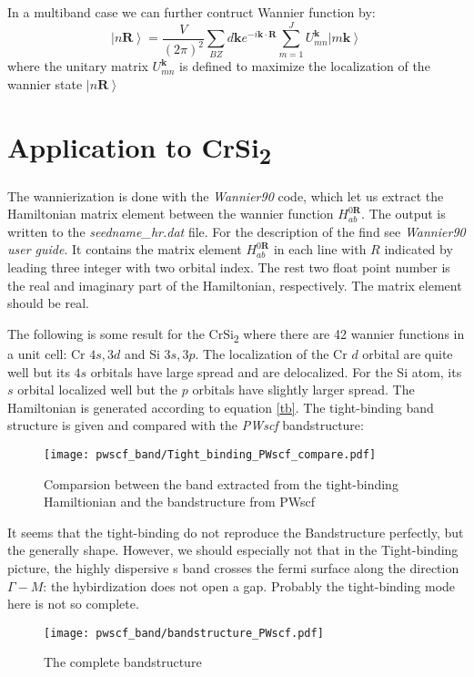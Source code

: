 \documentclass{amsart}
\begin{document}
In a multiband case we can further contruct Wannier function by:
\begin{equation}
    \left| n\bm{R} \right\rangle = \frac{V}{(2\pi)^2}\sum_{BZ} d\bm{k} e^{-i\bm{k}\cdot\bm{R}} \sum_{m=1}^J U_{mn}^{\bm{k}}\left| m\bm{k} \right\rangle 
\end{equation}
where the unitary matrix $U_{mn}^{\bm{k}}$ is defined to maximize the localization of the wannier state $\left| n\bm{R} \right\rangle$

\section{Application to CrSi\textsubscript{2}}
The wannierization is done with the \emph{Wannier90} code, which let us extract the Hamiltonian matrix element between the wannier function $H_{ab}^{0\bm{R}}$.
The output is written to the \emph{seedname\_hr.dat} file. For the description of the find see \emph{Wannier90 user guide}. 
It contains the matrix element $H_{ab}^{0\bm{R}}$ in each line with $R$ indicated by leading three integer with two orbital index. The rest two float point number
is the real and imaginary part of the Hamiltonian, respectively. The matrix element should be real.

The following is some result for the CrSi\textsubscript{2} where there are 42 wannier functions in a unit cell: Cr $4s,3d$ and Si $3s,3p$. 
The localization of the Cr $d$ orbital are quite well but its $4s$ orbitals have large spread and are delocalized. 
For the Si atom, its $s$ orbital localized well but the $p$ orbitals have slightly larger spread. The Hamiltonian is generated according to equation \ref{tb}. 
The tight-binding band structure is given and compared with the \emph{PWscf} bandstructure:
\begin{figure}[h]
    \texttt{[image: pwscf\_band/Tight\_binding\_PWscf\_compare.pdf]}
    \centering
    \caption{Comparsion between the band extracted from the tight-binding Hamiltionian and the bandstructure from PWscf}
\end{figure}
It seems that the tight-binding do not reproduce the Bandstructure perfectly, but the generally shape. 
However, we should especially not that in the Tight-binding picture, the highly dispersive s band crosses the fermi surface along the direction $\Gamma-M$: 
the hybirdization does not open a gap. Probably the tight-binding mode here is not so complete.
\begin{figure}[h]
    \centering
    \texttt{[image: pwscf\_band/bandstructure\_PWscf.pdf]}
    \caption{The complete bandstructure}
\end{figure}
\end{document}
